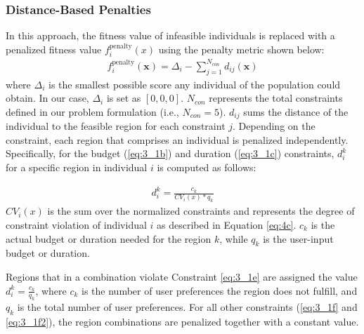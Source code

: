 \subsubsection{Distance-Based Penalties}
In this approach, the fitness value of infeasible individuals is replaced with a penalized fitness value $f^\mathrm{penalty}_i(x)$ using the penalty metric shown below:
\begin{align*}
    f^\mathrm{penalty}_i(\mathbf{x}) = \Delta_i - \sum_{j=1}^{N_{con}} d_{ij}(\mathbf{x})
\end{align*}
where $\Delta_i$ is the smallest possible score any individual of the population could obtain. In our case, $\Delta_i$ is set as $[0,0,0]$. $N_{con}$ represents the total constraints defined in our problem formulation (i.e., $N_{con} = 5$). $d_{ij}$ sums the distance of the individual to the feasible region for each constraint $j$. Depending on the constraint, each region that comprises an individual is penalized independently. Specifically, for the budget (\ref{eq:3_1b}) and duration (\ref{eq:3_1c}) constraints, $d_i^k$ for a specific region in individual $i$ is computed as follows:

\begin{align*}
    d_i^k =  \frac{c_k}{CV_i(x) * q_k} 
\end{align*}
$CV_i(x)$ is the sum over the normalized constraints and represents the degree of constraint violation of individual $i$ as described in Equation \ref{eq:4c}. $c_k$ is the actual budget or duration needed for the region $k$, while $q_k$ is the user-input budget or duration.

Regions that in a combination violate Constraint \ref{eq:3_1e} are assigned the value $d_i^k = \frac{c_k}{q_k}$, where $c_k$ is the number of user preferences the region does not fulfill, and $q_k$ is the total number of user preferences. For all other constraints (\ref{eq:3_1f} and \ref{eq:3_1f2}), the region combinations are penalized together with a constant value.

